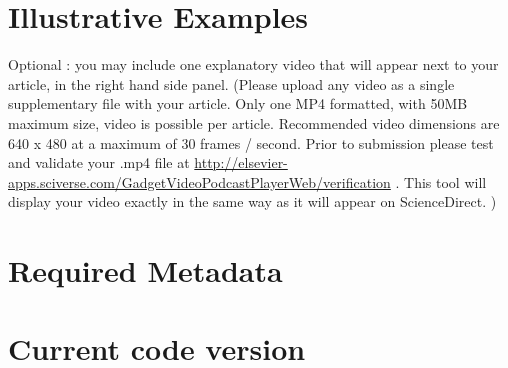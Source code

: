 \documentclass[preprint,12pt, a4paper]{elsarticle}
\begin{document}









\section*{Illustrative Examples}

Optional : you may include one explanatory  video that will appear next to your article, in the right hand side panel. (Please upload any video as a single supplementary file with your article. Only one MP4 formatted, with 50MB maximum size, video is possible per article. Recommended video dimensions are 640 x 480 at a maximum of 30 frames / second. Prior to submission please test and validate your .mp4 file at  \url{http://elsevier-apps.sciverse.com/GadgetVideoPodcastPlayerWeb/verification} . This tool will display your video exactly in the same way as it will appear on ScienceDirect. )


\section*{Required Metadata}
\label{}

\section*{Current code version}
\label{}
\end{document}
